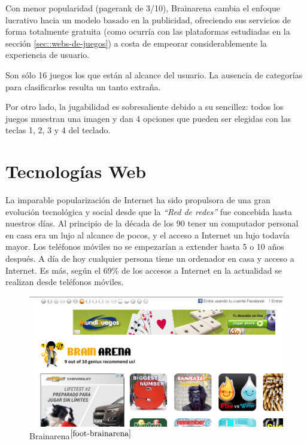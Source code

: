 Con menor popularidad (pagerank de 3/10), Brainarena cambia el enfoque lucrativo hacia un modelo basado en la publicidad, ofreciendo sus servicios de forma totalmente gratuita (como ocurría con las plataformas estudiadas en la sección \ref{sec::webs-de-juegos}) a costa de empeorar considerablemente la experiencia de usuario.

Son sólo 16 juegos los que están al alcance del usuario. La ausencia de categorías para clasificarlos resulta un tanto extraña.

Por otro lado, la jugabilidad es sobresaliente debido a su sencillez: todos los juegos muestran una imagen y dan 4 opciones que pueden ser elegidas con las teclas 1, 2, 3 y 4 del teclado.

\section{Tecnologías Web}
\label{sec::desarrollo-web}

La imparable popularización de Internet ha sido propulsora de una gran evolución tecnológica y social desde que la {\it ``Red de redes''} fue concebida hasta nuestros días. Al principio de la década de los 90 tener un computador personal en casa era un lujo al alcance de pocos, y el acceso a Internet un lujo todavía mayor. Los teléfonos móviles no se empezarían a extender hasta 5 o 10 años después. A día de hoy cualquier persona tiene un ordenador en casa y acceso a Internet. Es más, según \cite{Accenture2012} el 69\% de los accesos a Internet en la actualidad se realizan desde teléfonos móviles.

\begin{figure}[H]
  \begin{center}
    \includegraphics[width=\textwidth]{images/brainarena.png}
    \caption[Brainarena]{Brainarena$^{\ref{foot-brainarena}}$}
    \label{fig::brainarena}
  \end{center}
\end{figure}

